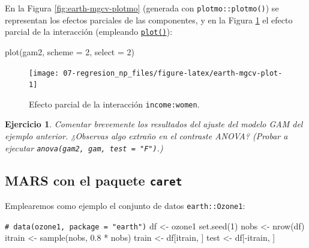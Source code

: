\documentclass[
]{book}
\newenvironment{Shaded}{\begin{snugshade}}{\end{snugshade}}
\newcommand{\AttributeTok}[1]{\textcolor[rgb]{0.77,0.63,0.00}{#1}}
\newcommand{\CommentTok}[1]{\textcolor[rgb]{0.56,0.35,0.01}{\textit{#1}}}
\newcommand{\DecValTok}[1]{\textcolor[rgb]{0.00,0.00,0.81}{#1}}
\newcommand{\FloatTok}[1]{\textcolor[rgb]{0.00,0.00,0.81}{#1}}
\newcommand{\FunctionTok}[1]{\textcolor[rgb]{0.00,0.00,0.00}{#1}}
\newcommand{\NormalTok}[1]{#1}
\newcommand{\OtherTok}[1]{\textcolor[rgb]{0.56,0.35,0.01}{#1}}
\newcommand{\SpecialCharTok}[1]{\textcolor[rgb]{0.00,0.00,0.00}{#1}}
\theoremstyle{break}
\newtheorem{exercise}{Ejercicio}[chapter]
\theoremstyle{nonumberplain}
\renewcommand{\CommentTok}[1]{\textcolor[rgb]{0.41,0.41,0.41}{\texttt{#1}}}
\begin{document}
En la Figura \ref{fig:earth-mgcv-plotmo} (generada con \texttt{plotmo::plotmo()}) se representan los efectos parciales de las componentes, y en la Figura \ref{fig:earth-mgcv-plot} el efecto parcial de la interacción (empleando \href{https://rdrr.io/pkg/mgcv/man/plot.gam.html}{\texttt{plot()}}):



\begin{Shaded}
\begin{Highlighting}[]
\FunctionTok{plot}\NormalTok{(gam2, }\AttributeTok{scheme =} \DecValTok{2}\NormalTok{, }\AttributeTok{select =} \DecValTok{2}\NormalTok{)}
\end{Highlighting}
\end{Shaded}

\begin{figure}[!htb]

{\centering \texttt{[image: 07-regresion\_np\_files/figure-latex/earth-mgcv-plot-1]} 

}

\caption{Efecto parcial de la interacción \texttt{income:women}.}\label{fig:earth-mgcv-plot}
\end{figure}

\begin{exercise}
\protect\hypertarget{exr:earth-mgcv-res}{}\label{exr:earth-mgcv-res}Comentar brevemente los resultados del ajuste del modelo GAM del ejemplo anterior.
¿Observas algo extraño en el contraste ANOVA?
(Probar a ejecutar \texttt{anova(gam2,\ gam,\ test\ =\ "F")}.)
\end{exercise}

\hypertarget{mars-con-el-paquete-caret}{%
\subsection{\texorpdfstring{MARS con el paquete \texttt{caret}}{MARS con el paquete caret}}\label{mars-con-el-paquete-caret}}

Emplearemos como ejemplo el conjunto de datos \texttt{earth::Ozone1}:

\begin{Shaded}
\begin{Highlighting}[]
\CommentTok{\# data(ozone1, package = "earth")}
\NormalTok{df }\OtherTok{\textless{}{-}}\NormalTok{ ozone1  }
\FunctionTok{set.seed}\NormalTok{(}\DecValTok{1}\NormalTok{)}
\NormalTok{nobs }\OtherTok{\textless{}{-}} \FunctionTok{nrow}\NormalTok{(df)}
\NormalTok{itrain }\OtherTok{\textless{}{-}} \FunctionTok{sample}\NormalTok{(nobs, }\FloatTok{0.8} \SpecialCharTok{*}\NormalTok{ nobs)}
\NormalTok{train }\OtherTok{\textless{}{-}}\NormalTok{ df[itrain, ]}
\NormalTok{test }\OtherTok{\textless{}{-}}\NormalTok{ df[}\SpecialCharTok{{-}}\NormalTok{itrain, ]}
\end{Highlighting}
\end{Shaded}
\end{document}
